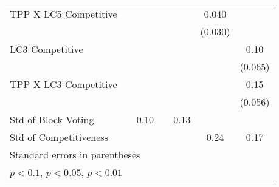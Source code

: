 {\begin{tabular}{l*{6}{c}}
TPP X LC5 Competitive&                  &                  &                  &                  &    0.040         &                  \\
                &                  &                  &                  &                  &  (0.030)         &                  \\
LC3 Competitive &                  &                  &                  &                  &                  &     0.10         \\
                &                  &                  &                  &                  &                  &  (0.065)         \\
TPP X LC3 Competitive&                  &                  &                  &                  &                  &     0.15\sym{**} \\
                &                  &                  &                  &                  &                  &  (0.056)         \\
\midrule
Std of Block Voting&                  &     0.10         &                  &     0.13         &                  &                  \\
Std of Competitiveness&                  &                  &                  &                  &     0.24         &     0.17         \\
\bottomrule
\multicolumn{7}{l}{\footnotesize Standard errors in parentheses}\\
\multicolumn{7}{l}{\footnotesize \sym{*} \(p<0.1\), \sym{**} \(p<0.05\), \sym{***} \(p<0.01\)}\\
\end{tabular}
}

